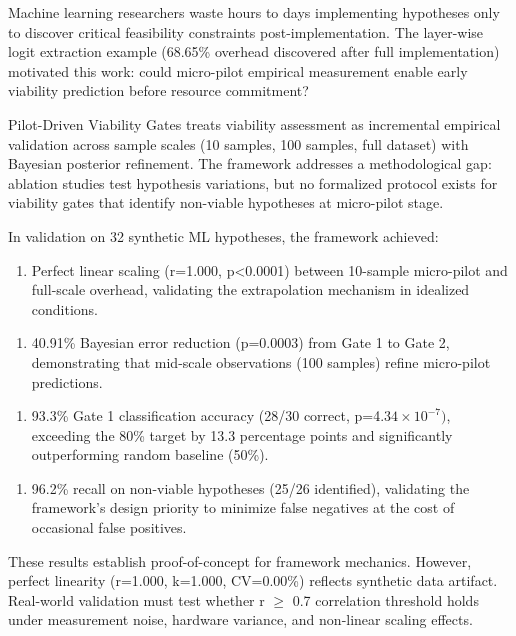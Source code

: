 
Machine learning researchers waste hours to days implementing hypotheses only to discover critical feasibility constraints post-implementation. The layer-wise logit extraction example (68.65\% overhead discovered after full implementation) motivated this work: could micro-pilot empirical measurement enable early viability prediction before resource commitment?

Pilot-Driven Viability Gates treats viability assessment as incremental empirical validation across sample scales (10 samples, 100 samples, full dataset) with Bayesian posterior refinement. The framework addresses a methodological gap: ablation studies test hypothesis variations, but no formalized protocol exists for viability gates that identify non-viable hypotheses at micro-pilot stage.

In validation on 32 synthetic ML hypotheses, the framework achieved:

\begin{enumerate}
\item Perfect linear scaling (r=1.000, p<0.0001) between 10-sample micro-pilot and full-scale overhead, validating the extrapolation mechanism in idealized conditions.
\end{enumerate}

\begin{enumerate}
\item 40.91\% Bayesian error reduction (p=0.0003) from Gate 1 to Gate 2, demonstrating that mid-scale observations (100 samples) refine micro-pilot predictions.
\end{enumerate}

\begin{enumerate}
\item 93.3\% Gate 1 classification accuracy (28/30 correct, p=4.$34\times 10^{-7})$, exceeding the 80\% target by 13.3 percentage points and significantly outperforming random baseline (50\%).
\end{enumerate}

\begin{enumerate}
\item 96.2\% recall on non-viable hypotheses (25/26 identified), validating the framework's design priority to minimize false negatives at the cost of occasional false positives.
\end{enumerate}

These results establish proof-of-concept for framework mechanics. However, perfect linearity (r=1.000, k=1.000, CV=0.00\%) reflects synthetic data artifact. Real-world validation must test whether r $\geq$ 0.7 correlation threshold holds under measurement noise, hardware variance, and non-linear scaling effects.

